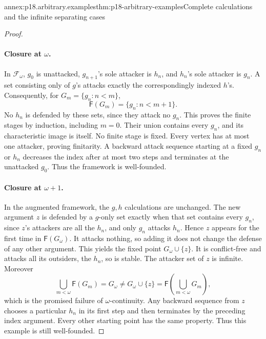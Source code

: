 \begin{annexitem}{annex:p18.arbitrary.examples}{thm:p18-arbitrary-examples}{Complete calculations and the infinite separating cases}
\begin{proof}
\paragraph{Closure at \(\omega\).}
In \(\mathcal F_\omega\), \(g_0\) is
unattacked, \(g_{n+1}\)'s sole attacker
is \(h_n\), and \(h_n\)'s sole
attacker is \(g_n\). A set consisting
only of \(g\)'s attacks exactly the
correspondingly indexed \(h\)'s.
Consequently, for
\(G_m=\{g_n:n<m\}\),
\[
                    \mathsf F(G_m)=\{g_n:n<m+1\}.
\]
No \(h_n\) is defended by these
sets, since they attack no \(g_n\).
This proves the finite stages
by induction, including \(m=0\).
Their union contains every \(g_n\),
and its characteristic image
is itself. No finite stage
is fixed. Every vertex has
at most one attacker, proving
finitarity. A backward attack
sequence starting at a fixed
\(g_n\) or \(h_n\) decreases
the index after at most two
steps and terminates at
the unattacked \(g_0\).
Thus the framework is
well-founded.

\paragraph{Closure at \(\omega+1\).}
In the augmented framework,
the \(g,h\) calculations
are unchanged. The new
argument \(z\) is defended
by a \(g\)-only set
exactly when that set
contains every \(g_n\),
since \(z\)'s attackers
are all the \(h_n\),
and only \(g_n\) attacks
\(h_n\). Hence \(z\)
appears for the first
time in \(\mathsf F(G_\omega)\).
It attacks nothing, so
adding it does not
change the defense
of any other argument.
This yields the fixed
point \(G_\omega\cup\{z\}\).
It is conflict-free and
attacks all its outsiders,
the \(h_n\), so is stable.
The attacker set of \(z\)
is infinite. Moreover
\[
 \bigcup_{m<\omega}\mathsf F(G_m)=G_\omega
        \ne G_\omega\cup\{z\}=\mathsf F\!\left(\bigcup_{m<\omega}G_m\right),
\]
which is the promised
failure of \(\omega\)-continuity.
Any backward sequence from
\(z\) chooses a particular
\(h_n\) in its first step
and then terminates by
the preceding index argument.
Every other starting point
has the same property.
Thus this example is
still well-founded.


\end{proof}
\end{annexitem}
